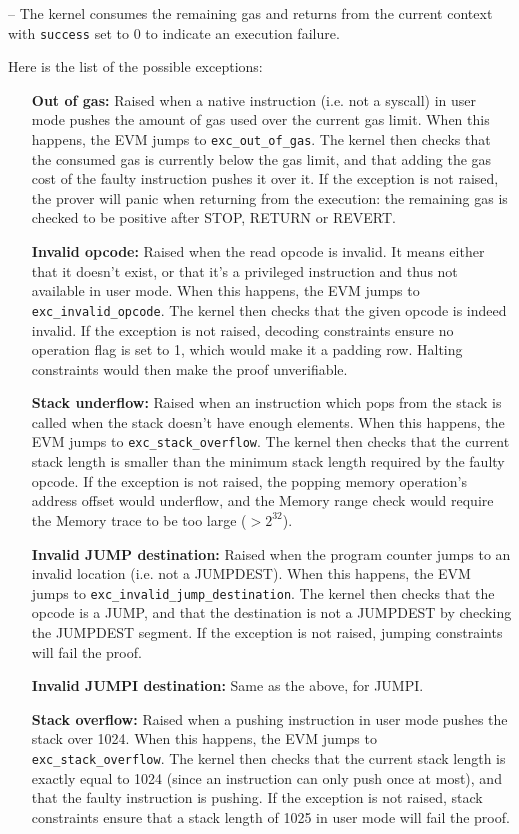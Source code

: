 -- The kernel consumes the remaining gas and returns from the current context with \texttt{success} set to 0 to indicate an execution failure.

Here is the list of the possible exceptions:

\begin{enumerate}[align=left]
  \item[\textbf{Out of gas:}] Raised when a native instruction (i.e. not a syscall) in user mode pushes the amount of gas used over the current gas limit.
When this happens, the EVM jumps to \texttt{exc\_out\_of\_gas}. The kernel then checks that the consumed gas is currently below the gas limit,
and that adding the gas cost of the faulty instruction pushes it over it.
If the exception is not raised, the prover will panic when returning from the execution: the remaining gas is checked to be positive after STOP, RETURN or REVERT.
  \item[\textbf{Invalid opcode:}] Raised when the read opcode is invalid. It means either that it doesn't exist, or that it's a privileged instruction and
thus not available in user mode. When this happens, the EVM jumps to \texttt{exc\_invalid\_opcode}. The kernel then checks that the given opcode is indeed invalid.
If the exception is not raised, decoding constraints ensure no operation flag is set to 1, which would make it a padding row. Halting constraints would then make the proof
unverifiable.
  \item[\textbf{Stack underflow:}] Raised when an instruction which pops from the stack is called when the stack doesn't have enough elements.
When this happens, the EVM jumps to \texttt{exc\_stack\_overflow}. The kernel then checks that the current stack length is smaller than the minimum 
stack length required by the faulty opcode.
If the exception is not raised, the popping memory operation's address offset would underflow, and the Memory range check would require the Memory trace to be too
large ($>2^{32}$).
  \item[\textbf{Invalid JUMP destination:}] Raised when the program counter jumps to an invalid location (i.e. not a JUMPDEST). When this happens, the EVM jumps to
\texttt{exc\_invalid\_jump\_destination}. The kernel then checks that the opcode is a JUMP, and that the destination is not a JUMPDEST by checking the
JUMPDEST segment.
If the exception is not raised, jumping constraints will fail the proof.
  \item[\textbf{Invalid JUMPI destination:}] Same as the above, for JUMPI.
  \item[\textbf{Stack overflow:}] Raised when a pushing instruction in user mode pushes the stack over 1024. When this happens, the EVM jumps
to \texttt{exc\_stack\_overflow}. The kernel then checks that the current stack length is exactly equal to 1024 (since an instruction can only
push once at most), and that the faulty instruction is pushing.
If the exception is not raised, stack constraints ensure that a stack length of 1025 in user mode will fail the proof.
\end{enumerate}
